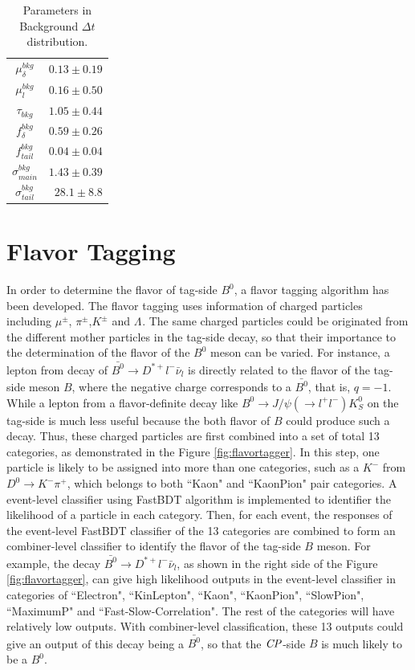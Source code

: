 \begin{table}[htpb]
	\centering
	\begin{tabular}{|c|r|}
		\hline
		$\mu^{bkg}_{\delta}$ & $0.13 \pm 0.19$\\
		$\mu^{bkg}_{l}$&  $0.16 \pm 0.50$ \\
		$\tau_{bkg}$ & $1.05\pm 0.44$\\
		$f_{\delta}^{bkg}$ &  $0.59\pm 0.26$\\
		$f^{bkg}_{tail}$  & $0.04\pm 0.04$ \\
		$\sigma^{bkg}_{main}$ & $1.43\pm 0.39$\\
		$\sigma^{bkg}_{tail}$ & $28.1 \pm 8.8$\\
		\hline
	\end{tabular}
	\caption{Parameters in Background $\Delta t$ distribution. }
	\label{tab:Pbkg}
\end{table}

\section{Flavor Tagging}
 In order to determine the flavor of tag-side $B^0$, a flavor tagging algorithm has been developed. The flavor tagging uses information of charged particles including $\mu^{\pm}$, $\pi^{\pm}$,$K^{\pm}$ and $\Lambda^{}$. The same charged particles could be originated from the different mother particles in the tag-side decay, so that their importance to the determination of the flavor of the $B^0$ meson can be varied. For instance, a lepton from decay of $\bar{B^0}\to D^{*+}l^{-}\bar{\nu}_l$ is directly related to the flavor of the tag-side meson $B$, where the negative charge corresponds to a $\bar{B^0}$, that is, $q=-1$. While a lepton from a flavor-definite decay like $B^0\to J/\psi(\to l^+l^-) K^0_S$ on the tag-side is much less useful because the both flavor of $B$ could produce such a decay. Thus, these charged particles are first combined into a set of total 13 categories, as demonstrated in the Figure \ref{fig:flavortagger}. In this step, one particle is likely to be assigned into more than one categories, such as a $K^-$ from $D^0\to K^-\pi^+$, which belongs to both ``Kaon" and ``KaonPion" pair categories. A event-level classifier using FastBDT algorithm is implemented to identifier the likelihood of a particle in each category. Then, for each event, the responses of the event-level FastBDT classifier of the 13 categories are combined to form an combiner-level classifier to identify the flavor of the tag-side $B$ meson. For example, the decay $\bar{B^0}\to D^{*+}l^{-}\bar{\nu}_l$, as shown in the right side of the Figure \ref{fig:flavortagger}, can give high likelihood outputs in the event-level classifier in categories of ``Electron", ``KinLepton", ``Kaon", ``KaonPion", ``SlowPion", ``MaximumP" and ``Fast-Slow-Correlation". The rest of the categories will have relatively low outputs. With combiner-level classification, these 13 outputs could give an output of this decay being a  $\bar{B^0}$, so that the $\it{CP}$-side $B$ is much likely to be a $B^0$. 

